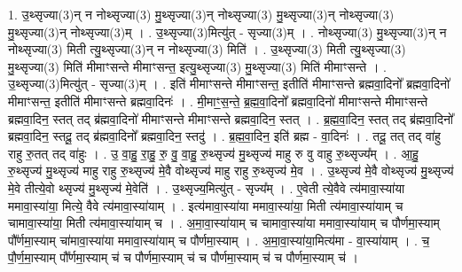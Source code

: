 \documentclass[17pt]{extarticle}
\begin{document}
1. उ॒थ्सृज्या(3)न् न नोथ्सृज्या(3) मु॒थ्सृज्या(3)न् नोथ्सृज्या(3) मु॒थ्सृज्या(3)न् नोथ्सृज्या(3) मु॒थ्सृज्या(3)न् नोथ्सृज्या(3)म् । . उ॒थ्सृज्या(3)मित्यु॑त् - सृज्या(3)म् । . नोथ्सृज्या(3) मु॒थ्सृज्या(3)न् न नोथ्सृज्या(3) मिती त्यु॒थ्सृज्या(3)न् न नोथ्सृज्या(3) मिति॑ । . उ॒थ्सृज्या(3) मिती त्यु॒थ्सृज्या(3) मु॒थ्सृज्या(3) मिति॑ मीमाꣳसन्ते मीमाꣳसन्त॒ इत्यु॒थ्सृज्या(3) मु॒थ्सृज्या(3) मिति॑ मीमाꣳसन्ते । . उ॒थ्सृज्या(3)मित्यु॑त् - सृज्या(3)म् । . इति॑ मीमाꣳसन्ते मीमाꣳसन्त॒ इतीति॑ मीमाꣳसन्ते ब्रह्मवा॒दिनो᳚ ब्रह्मवा॒दिनो॑ मीमाꣳसन्त॒ इतीति॑ मीमाꣳसन्ते ब्रह्मवा॒दिनः॑ । . मी॒माꣳ॒॒स॒न्ते॒ ब्र॒ह्म॒वा॒दिनो᳚ ब्रह्मवा॒दिनो॑ मीमाꣳसन्ते मीमाꣳसन्ते ब्रह्मवा॒दिन॒ स्तत् तद् ब्र॑ह्मवा॒दिनो॑ मीमाꣳसन्ते मीमाꣳसन्ते ब्रह्मवा॒दिन॒ स्तत् । . ब्र॒ह्म॒वा॒दिन॒ स्तत् तद् ब्र॑ह्मवा॒दिनो᳚ ब्रह्मवा॒दिन॒ स्तदू॒ तद् ब्र॑ह्मवा॒दिनो᳚ ब्रह्मवा॒दिन॒ स्तदु॑ । . ब्र॒ह्म॒वा॒दिन॒ इति॑ ब्रह्म - वा॒दिनः॑ । . तदू॒ तत् तद् वा॑हु राहु रु॒तत् तद् वा॑हुः । . उ॒ वा॒हु॒ रा॒हु॒ रु॒ वु॒ वा॒हु॒ रु॒थ्सृज्य॑ मु॒थ्सृज्य॑ माहु रु वु वाहु रु॒थ्सृज्य᳚म् । . आ॒हु॒ रु॒थ्सृज्य॑ मु॒थ्सृज्य॑ माहु राहु रु॒थ्सृज्य॑ मे॒वै वोथ्सृज्य॑ माहु राहु रु॒थ्सृज्य॑ मे॒व । . उ॒थ्सृज्य॑ मे॒वै वोथ्सृज्य॑ मु॒थ्सृज्य॑ मे॒वे तीत्ये॒वो थ्सृज्य॑ मु॒थ्सृज्य॑ मे॒वेति॑ । . उ॒थ्सृज्य॒मित्यु॑त् - सृज्य᳚म् । . ए॒वेती त्ये॒वैवे त्य॑मावा॒स्या॑या ममावा॒स्या॑या॒ मित्ये॒ वैवे त्य॑मावा॒स्या॑याम् । . इत्य॑मावा॒स्या॑या ममावा॒स्या॑या॒ मिती त्य॑मावा॒स्या॑याम् च चामावा॒स्या॑या॒ मिती त्य॑मावा॒स्या॑याम् च । . अ॒मा॒वा॒स्या॑याम् च चामावा॒स्या॑या ममावा॒स्या॑याम् च पौर्णमा॒स्याम् पौ᳚र्णमा॒स्याम् चा॑मावा॒स्या॑या ममावा॒स्या॑याम् च पौर्णमा॒स्याम् । . अ॒मा॒वा॒स्या॑या॒मित्य॑मा - वा॒स्या॑याम् । . च॒ पौ॒र्ण॒मा॒स्याम् पौ᳚र्णमा॒स्याम् च॑ च पौर्णमा॒स्याम् च॑ च पौर्णमा॒स्याम् च॑ च पौर्णमा॒स्याम् च॑ । \newline
\end{document}
